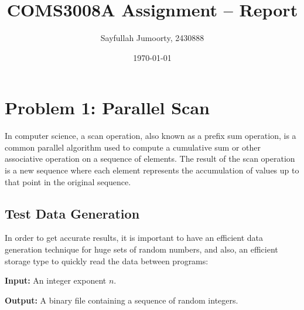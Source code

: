 
\title{COMS3008A Assignment -- Report}
\author{Sayfullah Jumoorty, 2430888}
\date{\today}
\maketitle 
\pagestyle{fancy}
\fancyhf{}
\fancyhead[R]{\thepage}
{} 

\section{Problem 1: Parallel Scan}
In computer science, a scan operation, also known as a prefix sum operation, is a common parallel algorithm used to compute a cumulative sum or other associative operation on a sequence of elements. The result of the scan operation is a new sequence where each element represents the accumulation of values up to that point in the original sequence.

\subsection{Test Data Generation}
In order to get accurate results, it is important to have an efficient data generation technique for huge sets of random numbers, and also, an efficient storage type to quickly read the data between programs:

\textbf{Input:} An integer exponent $n$.

\textbf{Output:} A binary file containing a sequence of random integers.

